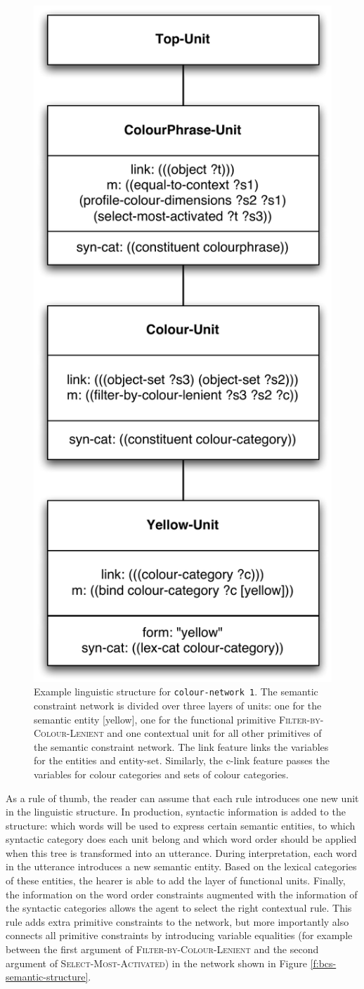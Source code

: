 \begin{figure}[htbp]
  \begin{center}
    \includegraphics[width=.45\textwidth]{./basic-strategy/figures/linguistic-structure.pdf}
    \caption[Example linguistic structure for basic colour
    strategy]{Example linguistic structure for \texttt{colour-network
        1}. The semantic constraint network is divided over three
      layers of units: one for the semantic entity [yellow], one for
      the functional primitive \textsc{Filter-by-Colour-Lenient} and
      one contextual unit for all other primitives of the semantic
      constraint network. The link feature links the variables for the
      entities and entity-set. Similarly, the c-link feature passes
      the variables for colour categories and sets of colour
      categories.}
    \label{f:bcs-linguistic-structure}
  \end{center}
\end{figure}

As a rule of thumb, the reader can assume that each rule introduces
one new unit in the linguistic structure. In production, syntactic
information is added to the structure: which words will be used to
express certain semantic entities, to which syntactic category does
each unit belong and which word order should be applied when this tree
is transformed into an utterance. During interpretation, each word in
the utterance introduces a new semantic entity. Based on the lexical
categories of these entities, the hearer is able to add the layer of
functional units. Finally, the information on the word order
constraints augmented with the information of the syntactic categories
allows the agent to select the right contextual rule. This rule adds
extra primitive constraints to the network, but more importantly also
connects all primitive constraints by introducing variable equalities
(for example between the first argument of
\textsc{Filter-by-Colour-Lenient} and the second argument of
\textsc{Select-Most-Activated}) in the network shown in Figure
\ref{f:bcs-semantic-structure}.

